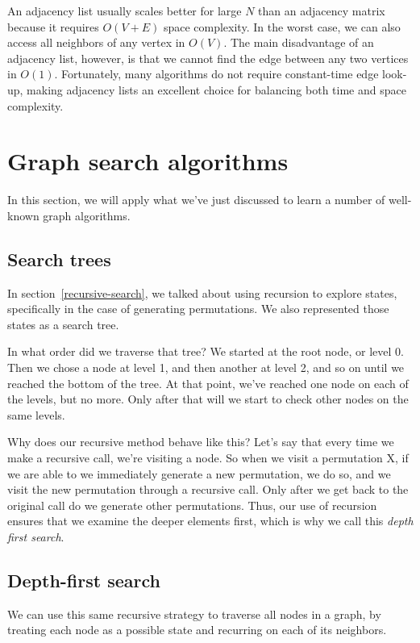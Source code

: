An adjacency list usually scales better for large $N$ than an adjacency matrix because it requires $O(V+E)$ space complexity. In the worst case, we can also access all neighbors of any vertex in $O(V)$. The main disadvantage of an adjacency list, however, is that we cannot find the edge between any two vertices in $O(1)$. Fortunately, many algorithms do not require constant-time edge look-up, making adjacency lists an excellent choice for balancing both time and space complexity. 


\section{Graph search algorithms}

In this section, we will apply what we've just discussed to learn a number of well-known graph algorithms. 


\subsection{Search trees}

In section~\ref{recursive-search}, we talked about using recursion to explore states, specifically in the case of generating permutations. We also represented those states as a search tree.

In what order did we traverse that tree? We started at the root node, or level 0. Then we chose a node at level 1, and then another at level 2, and so on until we reached the bottom of the tree. At that point, we've reached one node on each of the levels, but no more. Only after that will we start to check other nodes on the same levels.

Why does our recursive method behave like this? Let's say that every time we make a recursive call, we're visiting a node. So when we visit a permutation X, if we are able to we immediately generate a new permutation, we do so, and we visit the new permutation through a recursive call. Only after we get back to the original call do we generate other permutations. Thus, our use of recursion ensures that we examine the deeper elements first, which is why we call this \textit{depth first search}.


\subsection{Depth-first search}

We can use this same recursive strategy to traverse all nodes in a graph, by treating each node as a possible state and recurring on each of its neighbors.

